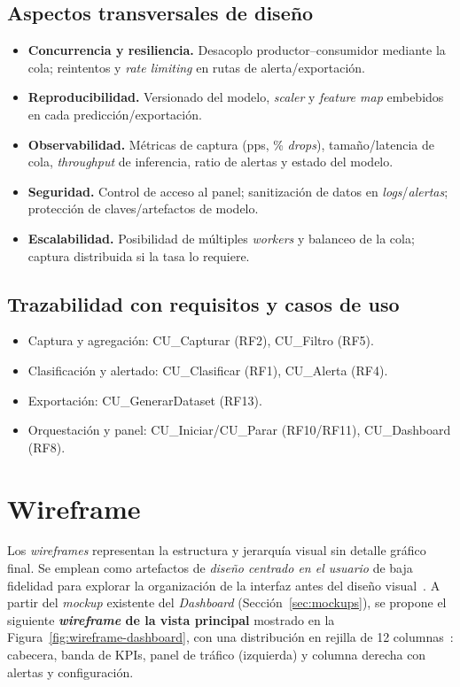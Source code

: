 \subsection*{Aspectos transversales de diseño}

\begin{itemize}
  \item \textbf{Concurrencia y resiliencia.} Desacoplo productor–consumidor mediante la cola; reintentos y \emph{rate limiting} en rutas de alerta/exportación.
  \item \textbf{Reproducibilidad.} Versionado del modelo, \emph{scaler} y \emph{feature map} embebidos en cada predicción/exportación.
  \item \textbf{Observabilidad.} Métricas de captura (pps, \% \textit{drops}), tamaño/latencia de cola, \textit{throughput} de inferencia, ratio de alertas y estado del modelo.
  \item \textbf{Seguridad.} Control de acceso al panel; sanitización de datos en \textit{logs}/\textit{alertas}; protección de claves/artefactos de modelo.
  \item \textbf{Escalabilidad.} Posibilidad de múltiples \emph{workers} y balanceo de la cola; captura distribuida si la tasa lo requiere.
\end{itemize}

\subsection*{Trazabilidad con requisitos y casos de uso}
\begin{itemize}
  \item Captura y agregación: CU\_Capturar (RF2), CU\_Filtro (RF5).
  \item Clasificación y alertado: CU\_Clasificar (RF1), CU\_Alerta (RF4).
  \item Exportación: CU\_GenerarDataset (RF13).
  \item Orquestación y panel: CU\_Iniciar/CU\_Parar (RF10/RF11), CU\_Dashboard (RF8).
\end{itemize}

\section{Wireframe}

Los \emph{wireframes} representan la estructura y jerarquía visual sin detalle gráfico final. Se emplean como artefactos de \emph{diseño centrado en el usuario} de baja fidelidad para explorar la organización de la interfaz antes del diseño visual~\cite{iso9241-210}. A partir del \emph{mockup} existente del \emph{Dashboard} (Sección~\ref{sec:mockups}), se propone el siguiente \textbf{\textit{wireframe} de la vista principal} mostrado en la Figura~\ref{fig:wireframe-dashboard}, con una distribución en rejilla de 12 columnas~\cite{tidwell2019designing,cooper2014aboutface}: cabecera, banda de KPIs, panel de tráfico (izquierda) y columna derecha con alertas y configuración.

